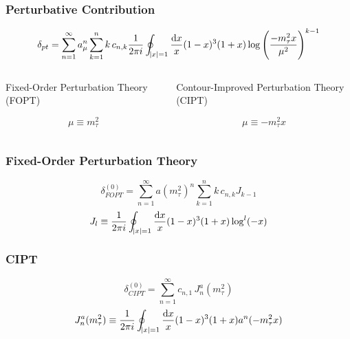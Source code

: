 \documentclass[fleqn]{beamer}
\begin{document}
\begin{frame}
  \frametitle{Perturbative Contribution}
  \begin{small}
    \begin{equation}
      \delta_{pt} = \sum_{n=1}^\infty a_\mu^n \sum_{k=1}^n k\, c_{n,k} \frac{1}{2 \pi i} \oint_{\abs{x}=1} \frac{\dif x}{x} (1-x)^3 (1+x) \log \left( \frac{-m_\tau^2 x}{\mu^2} \right)^{k-1}
    \end{equation}
    \centering
    \begin{columns}
      \begin{column}{.5\textwidth}
        \centering
        Fixed-Order Perturbation Theory (FOPT)
        \begin{ceqn}
          \begin{equation*}
            \mu \equiv m_\tau^2
          \end{equation*}
        \end{ceqn}
      \end{column}
      \begin{column}{.5\textwidth}
        \centering
        Contour-Improved Perturbation Theory (CIPT)
        \begin{ceqn}
          \begin{equation}
            \mu \equiv -m_\tau^2 x
          \end{equation}
        \end{ceqn}
      \end{column}
    \end{columns}
  \end{small}
\end{frame} 

\begin{frame}
  \frametitle{Fixed-Order Perturbation Theory}
  \begin{equation}
    \delta_{FOPT}^{(0)} = \sum_{n=1}^\infty a(m_\tau^2)^n \sum_{k=1}^n k\, c_{n,k} J_{k-1}
  \end{equation}
  \begin{equation}
    J_l \equiv \frac{1}{2\pi i} \oint_{\abs{x}=1} \frac{\dif x}{x} (1-x)^3 (1+x) \log^l(-x)
  \end{equation}
\end{frame}
\begin{frame}
  \frametitle{CIPT}
  \begin{equation}
    \delta_{CIPT}^{(0)} = \sum_{n=1}^\infty c_{n,1}\, J_n^a(m_\tau^2)
  \end{equation}
  \begin{equation}
    J_n^a(m_\tau^2) \equiv \frac{1}{2 \pi i} \oint_{\abs{x}=1} \frac{\dif x}{x} (1-x)^3 (1+x) a^n (-m_\tau^2 x)
  \end{equation}
\end{frame}
\end{document}
